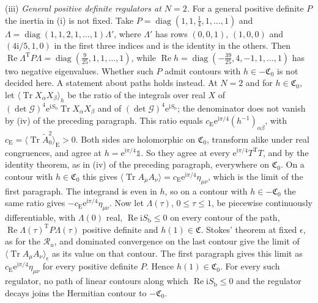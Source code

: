 (iii) \emph{General positive definite regulators at \(N=2\).} For a general positive definite \(P\) the inertia in (i) is not fixed. Take \(P=\operatorname{diag}(1,1,\tfrac14,1,\dots,1)\) and \(\Lambda=\operatorname{diag}(1,1,2,1,\dots,1)\Lambda'\), where \(\Lambda'\) has rows \((0,0,1)\), \((1,0,0)\) and \((4\mathrm i/5,1,0)\) in the first three indices and is the identity in the others. Then \(\operatorname{Re}\Lambda^{\mathrm T}P\Lambda=\operatorname{diag}(\tfrac9{25},1,1,\dots,1)\), while \(\operatorname{Re}h=\operatorname{diag}(-\tfrac{39}{25},4,-1,1,\dots,1)\) has two negative eigenvalues. Whether such \(P\) admit contours with \(h\in-\mathfrak C_0\) is not decided here. A statement about paths holds instead. At \(N=2\) and for \(h\in\mathfrak C_0\), let \(\langle\operatorname{Tr}X_\alpha X_\beta\rangle_h\) be the ratio of the integrals over real \(X\) of \((\det\mathcal G)^4\mathrm e^{\mathrm iS_{\mathrm b}}\operatorname{Tr}X_\alpha X_\beta\) and of \((\det\mathcal G)^4\mathrm e^{\mathrm iS_{\mathrm b}}\); the denominator does not vanish by (iv) of the preceding paragraph. This ratio equals \(c_{\mathrm E}\mathrm e^{\mathrm i\pi/4}(h^{-1})_{\alpha\beta}\), with \(c_{\mathrm E}=\langle\operatorname{Tr}\tilde A_0^2\rangle_{\mathrm E}>0\). Both sides are holomorphic on \(\mathfrak C_0\), transform alike under real congruences, and agree at \(h=\mathrm e^{\mathrm i\pi/4}\mathbb 1\). So they agree at every \(\mathrm e^{\mathrm i\pi/4}T^{\mathrm T}T\), and by the identity theorem, as in (iv) of the preceding paragraph, everywhere on \(\mathfrak C_0\). On a contour with \(h\in\mathfrak C_0\) this gives \(\langle\operatorname{Tr}A_\mu A_\nu\rangle=c_{\mathrm E}\mathrm e^{\mathrm i\pi/4}\eta_{\mu\nu}\), which is the limit of the first paragraph. The integrand is even in \(h\), so on a contour with \(h\in-\mathfrak C_0\) the same ratio gives \(-c_{\mathrm E}\mathrm e^{\mathrm i\pi/4}\eta_{\mu\nu}\). Now let \(\Lambda(\tau)\), \(0\le\tau\le1\), be piecewise continuously differentiable, with \(\Lambda(0)\) real, \(\operatorname{Re}\mathrm iS_{\mathrm b}\le0\) on every contour of the path, \(\operatorname{Re}\Lambda(\tau)^{\mathrm T}P\Lambda(\tau)\) positive definite and \(h(1)\in\mathfrak C\). Stokes' theorem at fixed \(\epsilon\), as for the \(\mathcal R_u\), and dominated convergence on the last contour give the limit of \(\langle\operatorname{Tr}A_\mu A_\nu\rangle_\epsilon\) as its value on that contour. The first paragraph gives this limit as \(c_{\mathrm E}\mathrm e^{\mathrm i\pi/4}\eta_{\mu\nu}\) for every positive definite \(P\). Hence \(h(1)\in\mathfrak C_0\). For every such regulator, no path of linear contours along which \(\operatorname{Re}\mathrm iS_{\mathrm b}\le0\) and the regulator decays joins the Hermitian contour to \(-\mathfrak C_0\).

